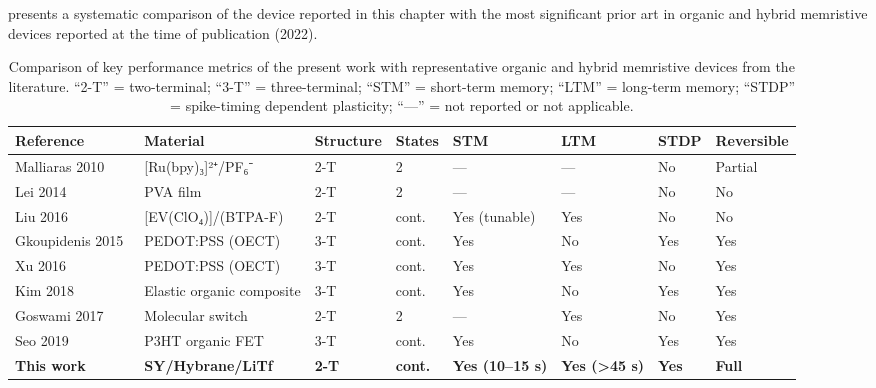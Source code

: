 \documentclass[12pt, a4paper, twoside]{report}
\begin{document}
 presents a systematic comparison of the device reported in this chapter with the most significant prior art in organic and hybrid memristive devices reported at the time of publication (2022).

\begin{table}[htb]
  \centering
  \caption{Comparison of key performance metrics of the present work with representative organic and hybrid memristive devices from the literature. ``2-T'' = two-terminal; ``3-T'' = three-terminal; ``STM'' = short-term memory; ``LTM'' = long-term memory; ``STDP'' = spike-timing dependent plasticity; ``---'' = not reported or not applicable.}\label{tab:comparison}
  \small
  \begin{tabularx}{\linewidth}{lXXXXXXX}
    \toprule
    \textbf{Reference} & \textbf{Material} & \textbf{Structure} & \textbf{States} & \textbf{STM} & \textbf{LTM} & \textbf{STDP} & \textbf{Reversible} \\
    \midrule
    Malliaras 2010~\cite{Zakhidov2010}     & [Ru(bpy)₃]²⁺/PF₆⁻       & 2-T & 2    & ---           & ---        & No  & Partial \\
    Lei 2014~\cite{Lei2014}                & PVA film                  & 2-T & 2    & ---           & ---        & No  & No      \\
    Liu 2016~\cite{Liu2016}                & [EV(ClO₄)]/(BTPA-F)      & 2-T & cont.& Yes (tunable) & Yes        & No  & No      \\
    Gkoupidenis 2015~\cite{Gkoupidenis2015}& PEDOT:PSS (OECT)          & 3-T & cont.& Yes           & No         & Yes & Yes     \\
    Xu 2016~\cite{Xu2016}                  & PEDOT:PSS (OECT)          & 3-T & cont.& Yes           & Yes        & No  & Yes     \\
    Kim 2018~\cite{Kim2018}                & Elastic organic composite & 3-T & cont.& Yes           & No         & Yes & Yes     \\
    Goswami 2017~\cite{Goswami2017}        & Molecular switch          & 2-T & 2    & ---           & Yes        & No  & Yes     \\
    Seo 2019~\cite{Seo2019}                & P3HT organic FET          & 3-T & cont.& Yes           & No         & Yes & Yes     \\
    \midrule
    \textbf{This work}~\cite{PradoSocorro2022} & \textbf{SY/Hybrane/LiTf}  & \textbf{2-T} & \textbf{cont.} & \textbf{Yes (10--15 s)} & \textbf{Yes (>45 s)} & \textbf{Yes} & \textbf{Full} \\
    \bottomrule
  \end{tabularx}
\end{table}
\end{document}
